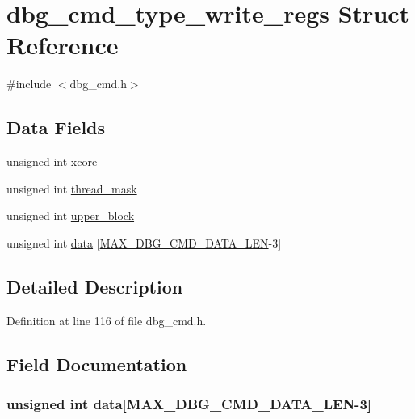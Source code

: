 \hypertarget{structdbg__cmd__type__write__regs}{\section{dbg\-\_\-cmd\-\_\-type\-\_\-write\-\_\-regs Struct Reference}
\label{structdbg__cmd__type__write__regs}
}


{\ttfamily \#include $<$dbg\-\_\-cmd.\-h$>$}

\subsection*{Data Fields}
\begin{DoxyCompactItemize}
\item 
unsigned int \hyperlink{structdbg__cmd__type__write__regs_a78357326dd562d441c3c73f5676ac638}{xcore}
\item 
unsigned int \hyperlink{structdbg__cmd__type__write__regs_a2cafb0001a9bc70c6466b0d0ab295c0a}{thread\-\_\-mask}
\item 
unsigned int \hyperlink{structdbg__cmd__type__write__regs_a78e2cce5b7b32d6e7d7f5b1cb281f39f}{upper\-\_\-block}
\item 
unsigned int \hyperlink{structdbg__cmd__type__write__regs_a728dc245dc576de10147524d6a701ef3}{data} \mbox{[}\hyperlink{dbg__cmd_8h_a4552ec15033c8a68870cdf80eda5470c}{M\-A\-X\-\_\-\-D\-B\-G\-\_\-\-C\-M\-D\-\_\-\-D\-A\-T\-A\-\_\-\-L\-E\-N}-\/3\mbox{]}
\end{DoxyCompactItemize}


\subsection{Detailed Description}


Definition at line 116 of file dbg\-\_\-cmd.\-h.



\subsection{Field Documentation}
\hypertarget{structdbg__cmd__type__write__regs_a728dc245dc576de10147524d6a701ef3}{
\subsubsection[{data}]{\setlength{\rightskip}{0pt plus 5cm}unsigned int data\mbox{[}{\bf M\-A\-X\-\_\-\-D\-B\-G\-\_\-\-C\-M\-D\-\_\-\-D\-A\-T\-A\-\_\-\-L\-E\-N}-\/3\mbox{]}}}\label{structdbg__cmd__type__write__regs_a728dc245dc576de10147524d6a701ef3}


